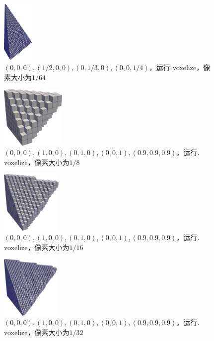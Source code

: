 \begin{figure}[!htbp]
  \centering
  \includegraphics[height=3cm]{fig/1/1.2/8.png}
    \caption{$(0,0,0),(1/2,0,0),(0,1/3,0),(0,0,1/4)$，运行$.\\$voxelize，像素大小为$1/64$}
  \label{fig:1-7}
\end{figure}

\begin{figure}[!htbp]
  \centering
  \includegraphics[height=3cm]{fig/1/1.2/9.png}
  \caption{$(0,0,0),(1,0,0),(0,1,0),(0,0,1),(0.9,0.9,0.9)$，运行$.\\$voxelize，像素大小为$1/8$}
  \label{fig:1-7}
\end{figure}

\begin{figure}[!htbp]
  \centering
  \includegraphics[height=3cm]{fig/1/1.2/10.png}
    \caption{$(0,0,0),(1,0,0),(0,1,0),(0,0,1),(0.9,0.9,0.9)$，运行$.\\$voxelize，像素大小为$1/16$}
  \label{fig:1-7}
\end{figure}

\begin{figure}[!htbp]
  \centering
  \includegraphics[height=3cm]{fig/1/1.2/11.png}
    \caption{$(0,0,0),(1,0,0),(0,1,0),(0,0,1),(0.9,0.9,0.9)$，运行$.\\$voxelize，像素大小为$1/32$}
  \label{fig:1-7}
\end{figure}

